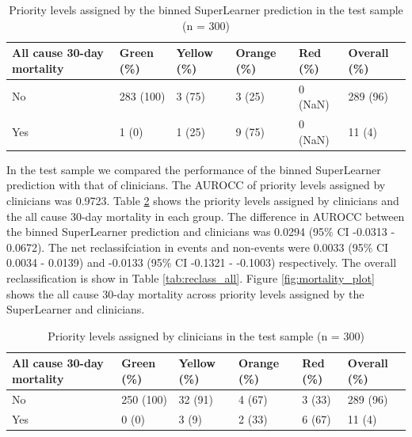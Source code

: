 \documentclass[10pt,letterpaper]{article}\usepackage[]{graphicx}\usepackage[]{color}
\begin{document}
\begin{table}[ht]
\centering
\caption{Priority levels assigned by the binned SuperLearner prediction in the test sample (n = 300)} 
\label{tab:superlearner_priorities_test}
\begin{tabular}{llllll}
  \hline
All cause 30-day mortality & Green (\%) & Yellow (\%) & Orange (\%) & Red (\%) & Overall (\%) \\ 
  \hline
No & 283 (100) & 3 (75) & 3 (25) & 0 (NaN) & 289 (96) \\ 
  Yes & 1 (0) & 1 (25) & 9 (75) & 0 (NaN) & 11 (4) \\ 
   \hline
\end{tabular}
\end{table}


In the test sample we compared the performance of the binned SuperLearner
prediction with that of clinicians. The AUROCC of priority levels assigned by
clinicians was 0.9723. Table \ref{tab:clinicians_priorities_test}
shows the priority levels assigned by clinicians and the all cause 30-day
mortality in each group. The difference in AUROCC between the binned
SuperLearner prediction and clinicians was
0.0294 (95\% CI -0.0313 - 0.0672). The net reclassifciation in events and
non-events were 0.0033 (95\% CI 0.0034 - 0.0139) and -0.0133 (95\% CI -0.1321 - -0.1003) respectively. The overall
reclassification is show in Table \ref{tab:reclass_all}. Figure
\ref{fig:mortality_plot} shows the all cause 30-day mortality across priority
levels assigned by the SuperLearner and clinicians.

\begin{table}[ht]
\centering
\caption{Priority levels assigned by clinicians in the test sample (n = 300)} 
\label{tab:clinicians_priorities_test}
\begin{tabular}{llllll}
  \hline
All cause 30-day mortality & Green (\%) & Yellow (\%) & Orange (\%) & Red (\%) & Overall (\%) \\ 
  \hline
No & 250 (100) & 32 (91) & 4 (67) & 3 (33) & 289 (96) \\ 
  Yes & 0 (0) & 3 (9) & 2 (33) & 6 (67) & 11 (4) \\ 
   \hline
\end{tabular}
\end{table}
\end{document}

